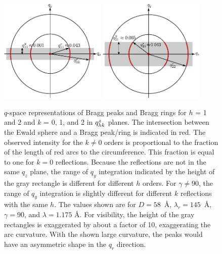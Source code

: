\begin{figure}[htbp]
  \centering
  \includegraphics[width=0.45\textwidth]{figures/ripple/analysis/ewald_side_h1_ver1}
  \includegraphics[width=0.45\textwidth]{figures/ripple/analysis/ewald_side_h2_ver1}
  \caption[$q$-space representations of Bragg peaks and Bragg rings 
  for $h$ = 1 and 2 and $k$ = 0, 1, and 2 in $\qz{hk}$ planes]
  {$q$-space representations of Bragg peaks and Bragg rings 
  for $h$ = 1 and 2 and $k$ = 0, 1, and 2 in $\qz{hk}$ planes.
  The intersection between the Ewald sphere and 
  a Bragg peak/ring is indicated in red. 
  The observed intensity for the $k\neq 0$ orders is proportional to
  the fraction of the length of red arcs to the circumference. This 
  fraction is equal to one for $k=0$ reflections.
  Because the reflections are not in the same $q_z$ plane, the range of $q_y$ 
  integration indicated by the height of the gray rectangle is different for different
  $h$ orders. For $\gamma\neq 90$\textdegree, the range of $q_y$ integration is
  slightly different for different $k$ reflections with the same $h$. 
  The values shown are for $D=58$~\AA, $\lambda_r=145$~\AA, $\gamma=90$\textdegree,
  and $\lambda=1.175$ \AA. For visibility, the height of the gray rectangles 
  is exaggerated by about a factor of 10, exaggerating the arc curvature.  
  With the shown large curvature, the peaks would have an asymmetric 
  shape in the $q_r$ direction.}
  \label{fig:ewald_side}
\end{figure}

